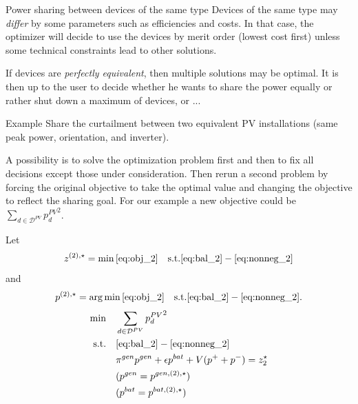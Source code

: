 \begin{frame}[allowframebreaks]{Power sharing between devices of the same type}
    Devices of the same type may \textit{differ} by some parameters such as efficiencies and costs. 
    In that case, the optimizer will decide to use the devices by \alert{merit order} (lowest cost first) unless some technical constraints lead to other solutions.

    If devices are \textit{perfectly equivalent}, then \alert{multiple solutions} may be optimal.
    It is then up to the user to decide whether he wants to share the power equally or rather shut down a maximum of devices, or ...
    
    \begin{block}{Example}
        Share the curtailment between two equivalent PV installations (same peak power, orientation, and inverter).    
    \end{block}
    A possibility is to solve the optimization problem first and then to fix all decisions except those under consideration.
    Then rerun a second problem by forcing the original objective to take the optimal value and changing the objective to reflect the sharing goal.
    For our example a new objective could be $\sum_{d \in\mathcal{D}^{PV}} {p^{PV}_d}^2$.

    Let $$z^{(2), \star} = \min \eqref{eq:obj_2} \quad \text{s.t.} \eqref{eq:bal_2} - \eqref{eq:nonneg_2}$$
    and $$p^{(2), \star} = \arg \min \eqref{eq:obj_2} \quad \text{s.t.} \eqref{eq:bal_2} - \eqref{eq:nonneg_2}.$$
    \begin{subequations}
        \label{eq:RT3}
    \begin{align}
    \min        \quad  & \sum_{d \in\mathcal{D}^{PV}} {p^{PV}_d}^2 \label{eq:obj_3}\\
    \text{s.t.} \quad  & \eqref{eq:bal_2} - \eqref{eq:nonneg_2}  \label{eq:const_3} \\
                       & \pi^{gen} p^{gen}  + \epsilon p^{bat} + V (p^+ + p^-) = z_2^\star \label{eq:eq_obj_3}\\
                       & (p^{gen} = p^{gen, (2), \star})\\
                       & (p^{bat} = p^{bat, (2), \star})
    \end{align}
    \end{subequations}

\end{frame}

